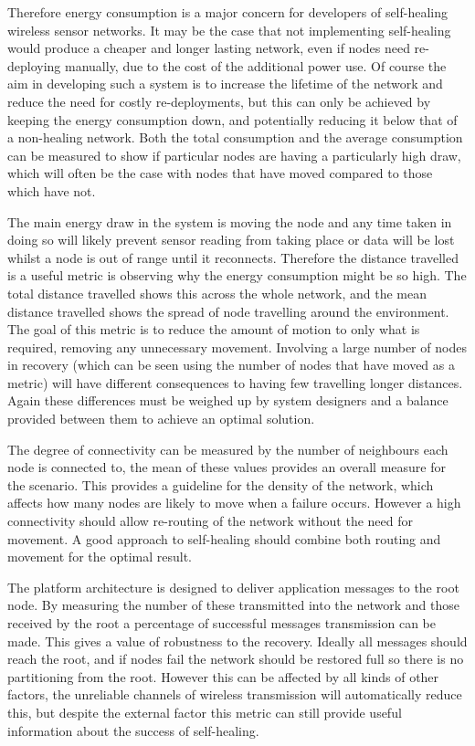 \documentclass[authoryearcitations]{UoYCSproject}
\begin{document}
Therefore energy consumption is a major concern for developers of self-healing wireless sensor networks. It may be the case that not implementing self-healing would produce a cheaper and longer lasting network, even if nodes need re-deploying manually, due to the cost of the additional power use. Of course the aim in developing such a system is to increase the lifetime of the network and reduce the need for costly re-deployments, but this can only be achieved by keeping the energy consumption down, and potentially reducing it below that of a non-healing network. Both the total consumption and the average consumption can be measured to show if particular nodes are having a particularly high draw, which will often be the case with nodes that have moved compared to those which have not.

The main energy draw in the system is moving the node and any time taken in doing so will likely prevent sensor reading from taking place or data will be lost whilst a node is out of range until it reconnects. Therefore the distance travelled is a useful metric is observing why the energy consumption might be so high. The total distance travelled shows this across the whole network, and the mean distance travelled shows the spread of node travelling around the environment. The goal of this metric is to reduce the amount of motion to only what is required, removing any unnecessary movement. Involving a large number of nodes in recovery (which can be seen using the number of nodes that have moved as a metric) will have different consequences to having few travelling longer distances. Again these differences must be weighed up by system designers and a balance provided between them to achieve an optimal solution.

The degree of connectivity can be measured by the number of neighbours each node is connected to, the mean of these values provides an overall measure for the scenario. This provides a guideline for the density of the network, which affects how many nodes are likely to move when a failure occurs. However a high connectivity should allow re-routing of the network without the need for movement. A good approach to self-healing should combine both routing and movement for the optimal result.

The platform architecture is designed to deliver application messages to the root node. By measuring the number of these transmitted into the network and those received by the root a percentage of successful messages transmission can be made. This gives a value of robustness to the recovery. Ideally all messages should reach the root, and if nodes fail the network should be restored full so there is no partitioning from the root. However this can be affected by all kinds of other factors, the unreliable channels of wireless transmission will automatically reduce this, but despite the external factor this metric can still provide useful information about the success of self-healing.
\end{document}
